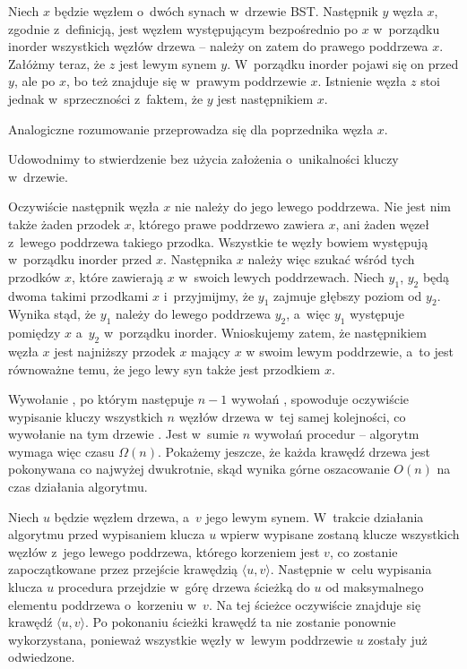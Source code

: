 \exercise %
Niech $x$ będzie węzłem o~dwóch synach w~drzewie BST.
Następnik $y$ węzła $x$, zgodnie z~definicją, jest węzłem występującym bezpośrednio po $x$ w~porządku inorder wszystkich węzłów drzewa -- należy on zatem do prawego poddrzewa $x$.
Załóżmy teraz, że $z$ jest lewym synem $y$.
W~porządku inorder pojawi się on przed $y$, ale po $x$, bo też znajduje się w~prawym poddrzewie $x$.
Istnienie węzła $z$ stoi jednak w~sprzeczności z~faktem, że $y$ jest następnikiem $x$.

Analogiczne rozumowanie przeprowadza się dla poprzednika węzła $x$.

\exercise %
Udowodnimy to stwierdzenie bez użycia założenia o~unikalności kluczy w~drzewie.

Oczywiście następnik węzła $x$ nie należy do jego lewego poddrzewa.
Nie jest nim także żaden przodek $x$, którego prawe poddrzewo zawiera $x$, ani żaden węzeł z~lewego poddrzewa takiego przodka.
Wszystkie te węzły bowiem występują w~porządku inorder przed $x$.
Następnika $x$ należy więc szukać wśród tych przodków $x$, które zawierają $x$ w~swoich lewych poddrzewach.
Niech $y_1$, $y_2$ będą dwoma takimi przodkami $x$ i~przyjmijmy, że $y_1$ zajmuje głębszy poziom od $y_2$.
Wynika stąd, że $y_1$ należy do lewego poddrzewa $y_2$, a~więc $y_1$ występuje pomiędzy $x$ a~$y_2$ w~porządku inorder.
Wnioskujemy zatem, że następnikiem węzła $x$ jest najniższy przodek $x$ mający $x$ w swoim lewym poddrzewie, a~to jest równoważne temu, że jego lewy syn także jest przodkiem $x$.

\exercise %
Wywołanie , po którym następuje $n-1$ wywołań , spowoduje oczywiście wypisanie kluczy wszystkich $n$ węzłów drzewa w~tej samej kolejności, co wywołanie na tym drzewie .
Jest w~sumie $n$ wywołań procedur -- algorytm wymaga więc czasu $\Omega(n)$.
Pokażemy jeszcze, że każda krawędź drzewa jest pokonywana co najwyżej dwukrotnie, skąd wynika górne oszacowanie $O(n)$ na czas działania algorytmu.

Niech $u$ będzie węzłem drzewa, a~$v$ jego lewym synem.
W~trakcie działania algorytmu przed wypisaniem klucza $u$ wpierw wypisane zostaną klucze wszystkich węzłów z~jego lewego poddrzewa, którego korzeniem jest $v$, co zostanie zapoczątkowane przez przejście krawędzią $\langle u,v\rangle$.
Następnie w~celu wypisania klucza $u$ procedura  przejdzie w~górę drzewa ścieżką do $u$ od maksymalnego elementu poddrzewa o~korzeniu w~$v$.
Na tej ścieżce oczywiście znajduje się krawędź $\langle u,v\rangle$.
Po pokonaniu ścieżki krawędź ta nie zostanie ponownie wykorzystana, ponieważ wszystkie węzły w~lewym poddrzewie $u$ zostały już odwiedzone.

